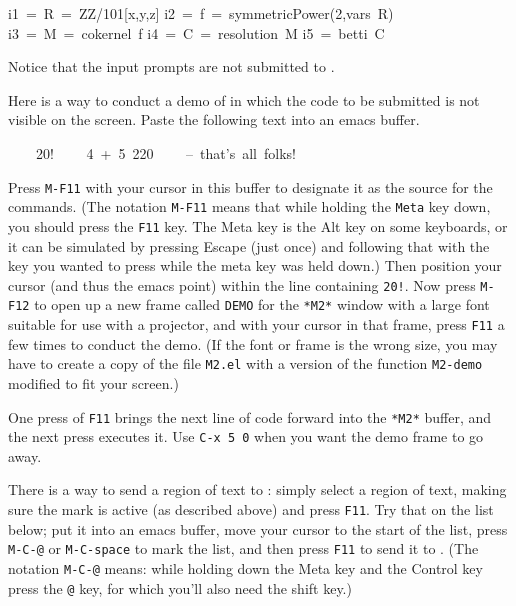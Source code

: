 \smallskip

{\ttfamily\obeylines
i1~=~R~=~ZZ/101[x,y,z]
i2~=~f~=~symmetricPower(2,vars~R)
i3~=~M~=~cokernel~f
i4~=~C~=~resolution~M
i5~=~betti~C
}

\smallskip

Notice that the input prompts are not submitted to \Mtwo.

Here is a way to conduct a demo of \Mtwo in which the code to be
submitted is not visible on the screen.  Paste the following text into
an emacs buffer.

\smallskip

{\ttfamily\obeylines
~~~~20!
~~~~4~+~5~2{}20
~~~~--~that's~all~folks!
}

\smallskip

Press {\tt {}M-F11} with your cursor in this buffer to designate it as
the source for the \Mtwo commands.  (The notation {\tt {}M-F11} means 
that while holding the {\tt {}Meta} key down, you should press the {\tt {}F11} 
key.  The Meta key is the Alt key on some keyboards, or it can be simulated by 
pressing Escape (just once) and following that with the key you wanted to press 
while the meta key was held down.)  Then position your cursor (and thus the 
emacs point) within the line containing {\tt {}20!}.  Now press {\tt {}M-F12}
to open up a new frame called {\tt {}DEMO} for the {\tt {}*M2*} window with
a large font suitable for use with a projector, and with your cursor in that
frame, press {\tt {}F11} a few times to conduct the demo.  (If the font or frame is the
wrong size, you may have to create a copy of the file {\tt {}M2.el}
with a version of the function {\tt {}M2-demo} modified to fit your screen.)

One press of {\tt {}F11} brings the next line of code forward into the
{\tt {}*M2*} buffer, and the next press executes it.  Use {\tt {}C-x\ 5\ 0} 
when you want the demo frame to go away.

There is a way to send a region of text to \Mtwo: simply select a region
of text, making sure the mark is active (as described above) and press {\tt {}F11}.
Try that on the list below; put it into an emacs buffer, move your cursor to the 
start of the list, press {\tt {}M-C-@} or {\tt {}M-C-space} to mark the list, 
and then press {\tt {}F11} to send it to \Mtwo.  (The notation {\tt {}M-C-@} 
means: while holding down the Meta key and the Control key press the {\tt {}@} key, 
for which you'll also need the shift key.)

\smallskip

